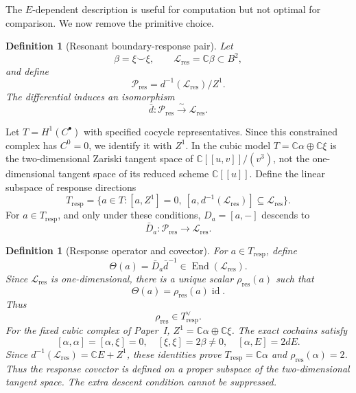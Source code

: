 \documentclass[11pt]{amsart}
\newtheorem{definition}[theorem]{Definition}
\newcommand{\C}{\mathbb C}
\newcommand{\End}{\operatorname{End}}
\newcommand{\id}{\operatorname{id}}
\begin{document}
The \(E\)-dependent description is useful for computation but not optimal for comparison.  We now remove the primitive choice.

\begin{definition}[Resonant boundary-response pair]
Let
\[
\beta=\xi\smile\xi,
\qquad
\mathcal L_{\mathrm{res}}=\C\beta\subset B^2,
\]
and define
\[
\mathcal P_{\mathrm{res}}
=d^{-1}(\mathcal L_{\mathrm{res}})/Z^1.
\]
The differential induces an isomorphism
\[
\bar d:\mathcal P_{\mathrm{res}}\xrightarrow{\sim}\mathcal L_{\mathrm{res}}.
\]
\end{definition}

Let $T=H^1(C^\bullet)$ with specified cocycle representatives.
Since this constrained complex has $C^0=0$, we identify it with $Z^1$.
In the cubic model $T=\C\alpha\oplus\C\xi$ is the two-dimensional
Zariski tangent space of $\C[[u,v]]/(v^3)$, not the one-dimensional
tangent space of its reduced scheme $\C[[u]]$.
Define the linear subspace of response directions
\[
T_{\mathrm{resp}}=
\{a\in T:
[a,Z^1]=0,\ 
[a,d^{-1}(\mathcal L_{\mathrm{res}})]\subseteq\mathcal L_{\mathrm{res}}\}.
\]
For \(a\in T_{\mathrm{resp}}\), and only under these conditions, \(D_a=[a,-]\) descends to
\[
\bar D_a:\mathcal P_{\mathrm{res}}\longrightarrow\mathcal L_{\mathrm{res}}.
\]

\begin{definition}[Response operator and covector]
For \(a\in T_{\mathrm{resp}}\), define
\[
\Theta(a)=\bar D_a\bar d^{-1}
\in\End(\mathcal L_{\mathrm{res}}).
\]
Since \(\mathcal L_{\mathrm{res}}\) is one-dimensional, there is a unique scalar \(\rho_{\mathrm{res}}(a)\) such that
\[
\Theta(a)=\rho_{\mathrm{res}}(a)\id.
\]
Thus
\[
\rho_{\mathrm{res}}\in T_{\mathrm{resp}}^\vee.
\]
For the fixed cubic complex of Paper~I, \(Z^1=\C\alpha\oplus\C\xi\).
The exact cochains satisfy
\[
[\alpha,\alpha]=[\alpha,\xi]=0,\quad
[\xi,\xi]=2\beta\ne0,\quad [\alpha,E]=2dE.
\]
Since \(d^{-1}(\mathcal L_{\mathrm{res}})=\C E+Z^1\), these identities prove
\(T_{\mathrm{resp}}=\C\alpha\) and \(\rho_{\mathrm{res}}(\alpha)=2\).
Thus the response covector is defined on a proper subspace of the two-dimensional
tangent space. The extra descent condition cannot be suppressed.
\end{definition}
\end{document}
